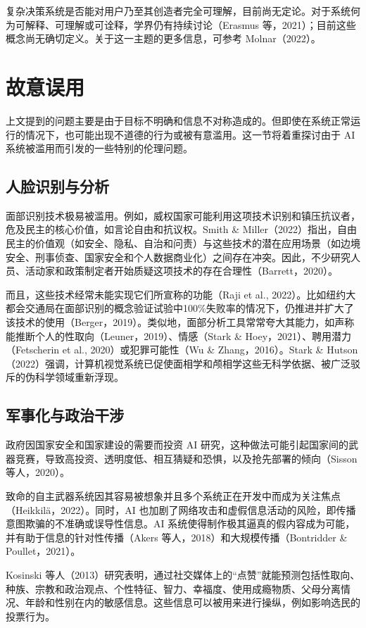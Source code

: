 \documentclass[lang=cn,newtx,10pt,scheme=chinese]{elegantbook}
\begin{document}
复杂决策系统是否能对用户乃至其创造者完全可理解，目前尚无定论。对于系统何为可解释、可理解或可诠释，学界仍有持续讨论（Erasmus 等，2021）；目前这些概念尚无确切定义。关于这一主题的更多信息，可参考 Molnar（2022）。

\section{故意误用}
上文提到的问题主要是由于目标不明确和信息不对称造成的。但即使在系统正常运行的情况下，也可能出现不道德的行为或被有意滥用。这一节将着重探讨由于 AI 系统被滥用而引发的一些特别的伦理问题。

\subsection{人脸识别与分析}
面部识别技术极易被滥用。例如，威权国家可能利用这项技术识别和镇压抗议者，危及民主的核心价值，如言论自由和抗议权。Smith \& Miller（2022）指出，自由民主的价值观（如安全、隐私、自治和问责）与这些技术的潜在应用场景（如边境安全、刑事侦查、国家安全和个人数据商业化）之间存在冲突。因此，不少研究人员、活动家和政策制定者开始质疑这项技术的存在合理性（Barrett，2020）。

而且，这些技术经常未能实现它们所宣称的功能（Raji et al., 2022）。比如纽约大都会交通局在面部识别的概念验证试验中100\%失败率的情况下，仍推进并扩大了该技术的使用（Berger，2019）。类似地，面部分析工具常常夸大其能力，如声称能推断个人的性取向（Leuner，2019）、情感（Stark \& Hoey，2021）、聘用潜力（Fetscherin et al., 2020）或犯罪可能性（Wu \& Zhang，2016）。Stark \& Hutson（2022）强调，计算机视觉系统已促使面相学和颅相学这些无科学依据、被广泛驳斥的伪科学领域重新浮现。

\subsection{军事化与政治干涉}
政府因国家安全和国家建设的需要而投资 AI 研究，这种做法可能引起国家间的武器竞赛，导致高投资、透明度低、相互猜疑和恐惧，以及抢先部署的倾向（Sisson 等人，2020）。

致命的自主武器系统因其容易被想象并且多个系统正在开发中而成为关注焦点（Heikkilä，2022）。同时，AI 也加剧了网络攻击和虚假信息活动的风险，即传播意图欺骗的不准确或误导性信息。AI 系统使得制作极其逼真的假内容成为可能，并有助于信息的针对性传播（Akers 等人，2018）和大规模传播（Bontridder \& Poullet，2021）。

Kosinski 等人（2013）研究表明，通过社交媒体上的“点赞”就能预测包括性取向、种族、宗教和政治观点、个性特征、智力、幸福度、使用成瘾物质、父母分离情况、年龄和性别在内的敏感信息。这些信息可以被用来进行操纵，例如影响选民的投票行为。
\end{document}
